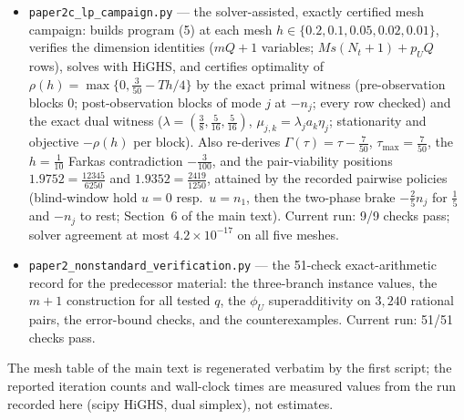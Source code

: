 \documentclass[10pt,article]{article}
\providecommand{\tightlist}{\setlength{\itemsep}{0pt}\setlength{\parskip}{0pt}}
\begin{document}
\begin{itemize}\tightlist
\item \texttt{paper2c\_lp\_campaign.py} --- the solver-assisted, exactly certified mesh
campaign: builds program (5) at each mesh \(h \in \{0.2, 0.1, 0.05, 0.02,
0.01\}\), verifies the dimension identities (\(mQ{+}1\) variables;
\(Ms(N_t{+}1) + p_U Q\) rows), solves with HiGHS, and certifies optimality of
\(\rho(h) = \max\{0, \tfrac{3}{50} - Th/4\}\) by the exact primal witness
(pre-observation blocks \(0\); post-observation blocks of mode \(j\) at
\(-n_j\); every row checked) and the exact dual witness
(\(\lambda = (\tfrac38, \tfrac5{16}, \tfrac5{16})\),
\(\mu_{j,k} = \lambda_j a_k \eta_j\); stationarity and objective \(-\rho(h)\)
per block). Also re-derives \(\Gamma(\tau) = \tau - \tfrac7{50}\),
\(\tau_{\max} = \tfrac7{50}\), the \(h = \tfrac1{10}\) Farkas contradiction
\(-\tfrac3{100}\), and the pair-viability positions \(1.9752 = \tfrac{12345}{6250}\) and
\(1.9352 = \tfrac{2419}{1250}\), attained by the recorded pairwise
policies (blind-window hold \(u = 0\) resp.\ \(u = n_1\), then the
two-phase brake \(-\tfrac25 n_j\) for \(\tfrac15\) and \(-n_j\) to
rest; Section~6 of the main text). Current run: 9/9 checks pass; solver agreement at most
\(4.2 \times 10^{-17}\) on all five meshes.
\item \texttt{paper2\_nonstandard\_verification.py} --- the 51-check
exact-arithmetic record for the predecessor material: the three-branch
instance values, the \(m+1\) construction for all tested \(q\), the
\(\phi_U\) superadditivity on \(3{,}240\) rational pairs, the error-bound
checks, and the counterexamples. Current run: 51/51 checks pass.
\end{itemize}

The mesh table of the main text is regenerated verbatim by the first script;
the reported iteration counts and wall-clock times are measured values from
the run recorded here (scipy HiGHS, dual simplex), not estimates.
\end{document}
